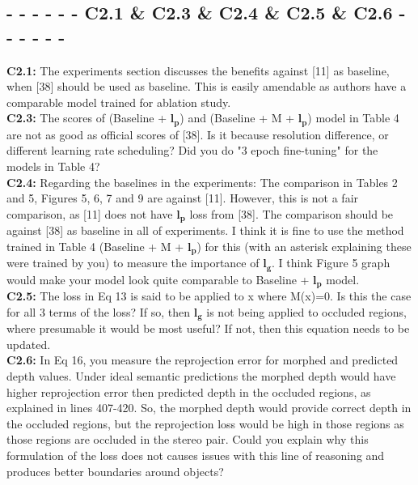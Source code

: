 \documentclass[10pt,twocolumn,letterpaper]{article}
\begin{document}
\subsection*{- - - - - - C2.1 \& C2.3 \& C2.4 \& C2.5 \& C2.6 - - - - - -}
\noindent\textbf{C2.1:} The experiments section discusses the benefits against [11] as baseline, when [38] should be used as baseline. This is easily amendable as authors have a comparable model trained for ablation study. \\
\noindent\textbf{C2.3:} The scores of (Baseline + $\mathbf{l_p}$) and (Baseline + M + $\mathbf{l_p}$) model in Table 4 are not as good as official scores of [38]. Is it because resolution difference, or different learning rate scheduling? Did you do "3 epoch fine-tuning" for the models in Table 4? \\
\noindent\textbf{C2.4:} Regarding the baselines in the experiments: The comparison in Tables 2 and 5, Figures 5, 6, 7 and 9 are against [11]. However, this is not a fair comparison, as [11] does not have $\mathbf{l_p}$ loss from [38]. The comparison should be against [38] as baseline in all of experiments. I think it is fine to use the method trained in Table 4 (Baseline + M + $\mathbf{l_p}$) for this (with an asterisk explaining these were trained by you) to measure the importance of $\mathbf{l_g}$. I think Figure 5 graph would make your model look quite comparable to Baseline + $\mathbf{l_p}$ model. \\ 
\noindent\textbf{C2.5:} The loss in Eq 13 is said to be applied to x where M(x)=0. Is this the case for all 3 terms of the loss? If so, then $\mathbf{l_g}$ is not being applied to occluded regions, where presumable it would be most useful? If not, then this equation needs to be updated. \\
\noindent\textbf{C2.6:} In Eq 16, you measure the reprojection error for morphed and predicted depth values. Under ideal semantic predictions the morphed depth would have higher reprojection error then predicted depth in the occluded regions, as explained in lines 407-420. So, the morphed depth would provide correct depth in the occluded regions, but the reprojection loss would be high in those regions as those regions are occluded in the stereo pair. Could you explain why this formulation of the loss does not causes issues with this line of reasoning and produces better boundaries around objects? \\ \\
\end{document}
